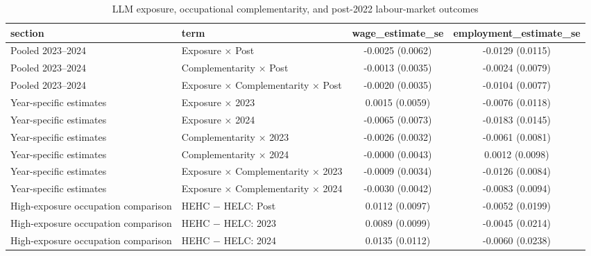 \begin{table}
\caption{LLM exposure, occupational complementarity, and post-2022 labour-market outcomes}
\label{tab:main_results}
\begin{tabular}{llcc}
\toprule
section & term & wage\_estimate\_se & employment\_estimate\_se \\
\midrule
Pooled 2023–2024 & Exposure × Post & -0.0025 (0.0062) & -0.0129 (0.0115) \\
Pooled 2023–2024 & Complementarity × Post & -0.0013 (0.0035) & -0.0024 (0.0079) \\
Pooled 2023–2024 & Exposure × Complementarity × Post & -0.0020 (0.0035) & -0.0104 (0.0077) \\
Year-specific estimates & Exposure × 2023 & 0.0015 (0.0059) & -0.0076 (0.0118) \\
Year-specific estimates & Exposure × 2024 & -0.0065 (0.0073) & -0.0183 (0.0145) \\
Year-specific estimates & Complementarity × 2023 & -0.0026 (0.0032) & -0.0061 (0.0081) \\
Year-specific estimates & Complementarity × 2024 & -0.0000 (0.0043) & 0.0012 (0.0098) \\
Year-specific estimates & Exposure × Complementarity × 2023 & -0.0009 (0.0034) & -0.0126 (0.0084) \\
Year-specific estimates & Exposure × Complementarity × 2024 & -0.0030 (0.0042) & -0.0083 (0.0094) \\
High-exposure occupation comparison & HEHC − HELC: Post & 0.0112 (0.0097) & -0.0052 (0.0199) \\
High-exposure occupation comparison & HEHC − HELC: 2023 & 0.0089 (0.0099) & -0.0045 (0.0214) \\
High-exposure occupation comparison & HEHC − HELC: 2024 & 0.0135 (0.0112) & -0.0060 (0.0238) \\
\bottomrule
\end{tabular}
\end{table}

